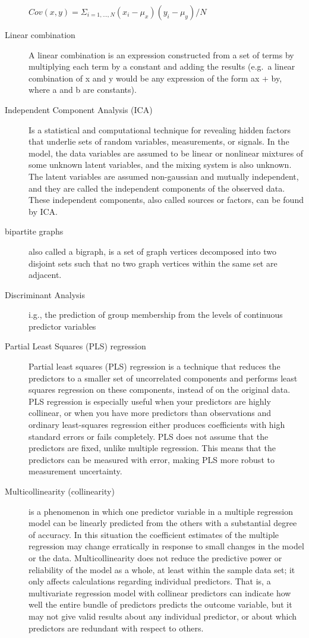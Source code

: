 \documentclass[
]{book}
\begin{document}
\begin{description}
\(Cov(x,y) = \Sigma_{i=1,…,N} (x_i - \mu_x)(y_i - \mu_y)/N\)
\item[Linear combination]
A linear combination is an expression constructed from a set of terms by multiplying each term by a constant and adding the results (e.g.~a linear combination of x and y would be any expression of the form ax + by, where a and b are constants).
\item[Independent Component Analysis (ICA)]
Is a statistical and computational technique for revealing hidden factors that underlie sets of random variables, measurements, or signals. In the model, the data variables are assumed to be linear or nonlinear mixtures of some unknown latent variables, and the mixing system is also unknown. The latent variables are assumed non-gaussian and mutually independent, and they are called the independent components of the observed data. These independent components, also called sources or factors, can be found by ICA.
\item[bipartite graphs]
also called a bigraph, is a set of graph vertices decomposed into two disjoint sets such that no two graph vertices within the same set are adjacent.
\item[Discriminant Analysis]
i.g., the prediction of group membership from the levels of continuous predictor variables
\item[Partial Least Squares (PLS) regression]
Partial least squares (PLS) regression is a technique that reduces the predictors to a smaller set of uncorrelated components and performs least squares regression on these components, instead of on the original data. PLS regression is especially useful when your predictors are highly collinear, or when you have more predictors than observations and ordinary least-squares regression either produces coefficients with high standard errors or fails completely. PLS does not assume that the predictors are fixed, unlike multiple regression. This means that the predictors can be measured with error, making PLS more robust to measurement uncertainty.
\item[Multicollinearity (collinearity)]
is a phenomenon in which one predictor variable in a multiple regression model can be linearly predicted from the others with a substantial degree of accuracy. In this situation the coefficient estimates of the multiple regression may change erratically in response to small changes in the model or the data. Multicollinearity does not reduce the predictive power or reliability of the model as a whole, at least within the sample data set; it only affects calculations regarding individual predictors. That is, a multivariate regression model with collinear predictors can indicate how well the entire bundle of predictors predicts the outcome variable, but it may not give valid results about any individual predictor, or about which predictors are redundant with respect to others.


\end{description}
\end{document}
